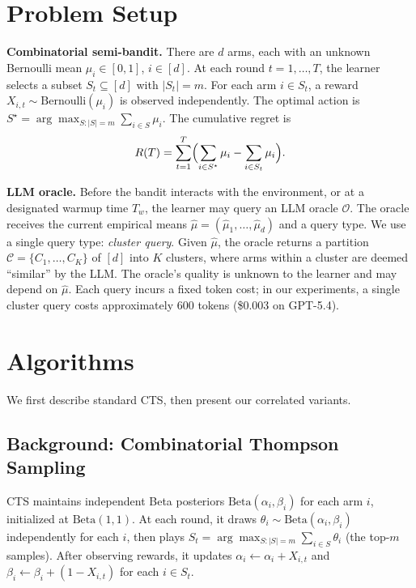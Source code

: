 \documentclass{article}
\theoremstyle{plain}
\theoremstyle{definition}
\theoremstyle{remark}
\newcommand{\opt}{S^{\star}}
\begin{document}
\section{Problem Setup}\label{sec:setup}

\textbf{Combinatorial semi-bandit.}
There are $d$ arms, each with an unknown Bernoulli mean $\mu_i \in [0,1]$, $i \in [d]$.
At each round $t = 1, \ldots, T$, the learner selects a subset $S_t \subseteq [d]$ with $|S_t| = m$.
For each arm $i \in S_t$, a reward $X_{i,t} \sim \text{Bernoulli}(\mu_i)$ is observed independently.
The optimal action is $\opt = \arg\max_{S:|S|=m} \sum_{i \in S} \mu_i$.
The cumulative regret is
\begin{equation}\label{eq:regret}
  R(T) = \sum_{t=1}^{T} \Bigl(\sum_{i \in \opt} \mu_i - \sum_{i \in S_t} \mu_i\Bigr).
\end{equation}

\textbf{LLM oracle.}
Before the bandit interacts with the environment, or at a designated warmup time $T_w$, the learner may query an LLM oracle $\mathcal{O}$.
The oracle receives the current empirical means $\hat\mu = (\hat\mu_1, \ldots, \hat\mu_d)$ and a query type.
We use a single query type: \emph{cluster query}.
Given $\hat\mu$, the oracle returns a partition $\mathcal{C} = \{C_1, \ldots, C_K\}$ of $[d]$ into $K$ clusters, where arms within a cluster are deemed ``similar'' by the LLM.
The oracle's quality is unknown to the learner and may depend on $\hat\mu$.
Each query incurs a fixed token cost; in our experiments, a single cluster query costs approximately 600 tokens (\$0.003 on GPT-5.4).

\section{Algorithms}\label{sec:algorithms}

We first describe standard CTS, then present our correlated variants.

\subsection{Background: Combinatorial Thompson Sampling}

CTS \citep{wang2018cts} maintains independent Beta posteriors $\text{Beta}(\alpha_i, \beta_i)$ for each arm $i$, initialized at $\text{Beta}(1,1)$.
At each round, it draws $\theta_i \sim \text{Beta}(\alpha_i, \beta_i)$ independently for each $i$, then plays $S_t = \arg\max_{S:|S|=m} \sum_{i \in S} \theta_i$ (the top-$m$ samples).
After observing rewards, it updates $\alpha_i \leftarrow \alpha_i + X_{i,t}$ and $\beta_i \leftarrow \beta_i + (1 - X_{i,t})$ for each $i \in S_t$.
\end{document}
